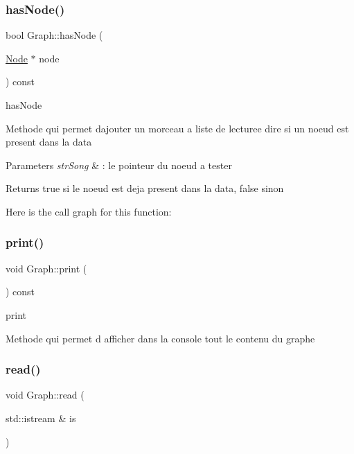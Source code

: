 \subsubsection{\texorpdfstring{has\+Node()}{hasNode()}}
{\footnotesize\ttfamily bool Graph\+::has\+Node (\begin{DoxyParamCaption}\item[{\mbox{\hyperlink{class_node}{Node}} $\ast$}]{node }\end{DoxyParamCaption}) const}



has\+Node 

Methode qui permet d\textquotesingle{}ajouter un morceau a liste de lecturee dire si un noeud est present dans la data


\begin{DoxyParams}{Parameters}
{\em str\+Song} & \+: le pointeur du noeud a tester \\
\hline
\end{DoxyParams}
\begin{DoxyReturn}{Returns}
true si le noeud est deja present dans la data, false sinon 
\end{DoxyReturn}
Here is the call graph for this function\+:
\mbox{\label{class_graph_aeeede3cb48be5d8cac08ea05ce54bd52}} 
\subsubsection{\texorpdfstring{print()}{print()}}
{\footnotesize\ttfamily void Graph\+::print (\begin{DoxyParamCaption}{ }\end{DoxyParamCaption}) const}



print 

Methode qui permet d afficher dans la console tout le contenu du graphe \mbox{\label{class_graph_a79b39cf3963c03095bb74017a23c145e}} 
\subsubsection{\texorpdfstring{read()}{read()}}
{\footnotesize\ttfamily void Graph\+::read (\begin{DoxyParamCaption}\item[{std\+::istream \&}]{is }\end{DoxyParamCaption})}




